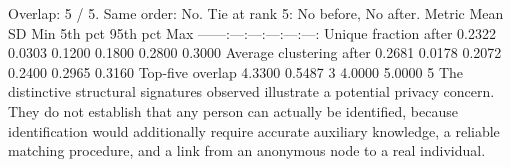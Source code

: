 {}Overlap: 5 / 5. Same order: No. Tie at rank 5: No before, No after.\markdownRendererParagraphSeparator
{}\markdownRendererParagraphSeparator
{}\markdownRendererPipe{} Metric \markdownRendererPipe{} Mean \markdownRendererPipe{} SD \markdownRendererPipe{} Min \markdownRendererPipe{} 5th pct \markdownRendererPipe{} 95th pct \markdownRendererPipe{} Max \markdownRendererPipe{}\markdownRendererSoftLineBreak
{}\markdownRendererPipe{}---\markdownRendererPipe{}---:\markdownRendererPipe{}---:\markdownRendererPipe{}---:\markdownRendererPipe{}---:\markdownRendererPipe{}---:\markdownRendererPipe{}---:\markdownRendererPipe{}\markdownRendererSoftLineBreak
{}\markdownRendererPipe{} Unique fraction after \markdownRendererPipe{} 0.2322 \markdownRendererPipe{} 0.0303 \markdownRendererPipe{} 0.1200 \markdownRendererPipe{} 0.1800 \markdownRendererPipe{} 0.2800 \markdownRendererPipe{} 0.3000 \markdownRendererPipe{}\markdownRendererSoftLineBreak
{}\markdownRendererPipe{} Average clustering after \markdownRendererPipe{} 0.2681 \markdownRendererPipe{} 0.0178 \markdownRendererPipe{} 0.2072 \markdownRendererPipe{} 0.2400 \markdownRendererPipe{} 0.2965 \markdownRendererPipe{} 0.3160 \markdownRendererPipe{}\markdownRendererSoftLineBreak
{}\markdownRendererPipe{} Top-five overlap \markdownRendererPipe{} 4.3300 \markdownRendererPipe{} 0.5487 \markdownRendererPipe{} 3 \markdownRendererPipe{} 4.0000 \markdownRendererPipe{} 5.0000 \markdownRendererPipe{} 5 \markdownRendererPipe{}\markdownRendererParagraphSeparator
{} The distinctive structural signatures observed illustrate a potential privacy concern. They do not establish that any person can actually be identified, because identification would additionally require accurate auxiliary knowledge, a reliable matching procedure, and a link from an anonymous node to a real individual.
\markdownRendererSectionEnd 
\markdownRendererSectionEnd \markdownRendererDocumentEnd